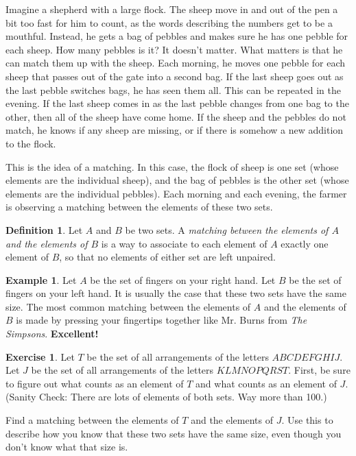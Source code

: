 \documentclass[12pt,letterpaper]{article}
\theoremstyle{definition}
\newtheorem{example}{Example}
\newtheorem{exercise}[question]{Exercise}
\newtheorem*{definition}{Definition}
\begin{document}
Imagine a shepherd with a large flock.
The sheep move in and out of the pen a bit too fast for him to count, as the words describing the numbers get to be a mouthful. 
Instead, he gets a bag of pebbles and makes sure he has one pebble for each sheep. 
How many pebbles is it?
It doesn't matter.
What matters is that he can match them up with the sheep.
Each morning, he moves one pebble for each sheep that passes out of the gate into a second bag.
If the last sheep goes out as the last pebble switches bags, he has seen them all.
This can be repeated in the evening. 
If the last sheep comes in as the last pebble changes from one bag to the other, then all of the sheep have come home.
If the sheep and the pebbles do not match, he knows if any sheep are missing, or if there is somehow a new addition to the flock.

This is the idea of a matching.
In this case, the flock of sheep is one set (whose elements are the individual sheep), and the bag of pebbles is the other set (whose elements are the individual pebbles).
Each morning and each evening, the farmer is observing a matching between the elements of these two sets.

\begin{definition}
Let $A$ and $B$ be two sets. A \emph{matching between the elements of $A$ and the elements of $B$} is a way to associate to each element of $A$ exactly one element of $B$, so that no elements of either set are left unpaired.
\end{definition}

\begin{example}
Let $A$ be the set of fingers on your right hand. 
Let $B$ be the set of fingers on your left hand. 
It is usually the case that these two sets have the same size. 
The most common matching between the elements of $A$ and the elements of $B$ is made by pressing your fingertips together like Mr. Burns from \emph{The Simpsons}. 
\textbf{Excellent!}
\end{example}

\begin{exercise}
Let $T$ be the set of all arrangements of the letters $ABCDEFGHIJ$.
Let $J$ be the set of all arrangements of the letters $KLMNOPQRST$.
First, be sure to figure out what counts as an element of $T$ and what counts as an element of $J$.
(Sanity Check: There are lots of elements of both sets.
Way more than 100.)

Find a matching between the elements of $T$ and the elements of $J$.
Use this to describe how you know that these two sets have the same size, even though you don't know what that size is.
\end{exercise}
\end{document}
